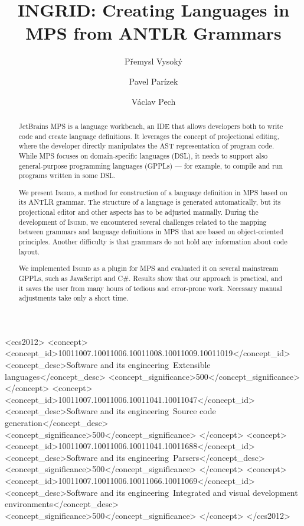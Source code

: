 \documentclass[sigplan,10pt,preprint]{acmart}
\begin{document}
\title{INGRID: Creating Languages in MPS from ANTLR Grammars}


\author{P\v{r}emysl Vysok\'y}

\author{Pavel Par\'izek}

\author{V\'aclav Pech}



\begin{abstract}
JetBrains MPS is a language workbench, an IDE that allows developers both to write code and create language definitions.
It leverages the concept of projectional editing, where the developer directly manipulates the AST representation of program code.
While MPS focuses on domain-specific languages (DSL), it needs to support also general-purpose programming languages (GPPLs) --- for example, to compile and run programs written in some DSL.

We present \textsc{Ingrid}, a method for construction of a language definition in MPS based on its ANTLR grammar.
The structure of a language is generated automatically, but its projectional editor and other aspects has to be adjusted manually.
During the development of \textsc{Ingrid}, we encountered several challenges related to the mapping between grammars and language definitions in MPS that are based on object-oriented principles.
Another difficulty is that grammars do not hold any information about code layout.

We implemented \textsc{Ingrid} as a plugin for MPS and evaluated it on several mainstream GPPLs, such as JavaScript and C\#.
Results show that our approach is practical, and it saves the user from many hours of tedious and error-prone work.
Necessary manual adjustments take only a short time.
\end{abstract}


 \begin{CCSXML}
<ccs2012>
<concept>
<concept_id>10011007.10011006.10011008.10011009.10011019</concept_id>
<concept_desc>Software and its engineering~Extensible languages</concept_desc>
<concept_significance>500</concept_significance>
</concept>
<concept>
<concept_id>10011007.10011006.10011041.10011047</concept_id>
<concept_desc>Software and its engineering~Source code generation</concept_desc>
<concept_significance>500</concept_significance>
</concept>
<concept>
<concept_id>10011007.10011006.10011041.10011688</concept_id>
<concept_desc>Software and its engineering~Parsers</concept_desc>
<concept_significance>500</concept_significance>
</concept>
<concept>
<concept_id>10011007.10011006.10011066.10011069</concept_id>
<concept_desc>Software and its engineering~Integrated and visual development environments</concept_desc>
<concept_significance>500</concept_significance>
</concept>
</ccs2012>
\end{CCSXML}
\end{document}
